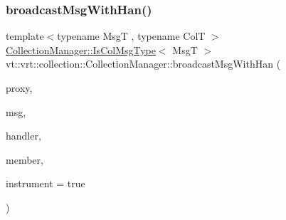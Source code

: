 \mbox{\label{structvt_1_1vrt_1_1collection_1_1_collection_manager_a737913f12b46ddaacf64a699c56c1787}} 
\subsubsection{\texorpdfstring{broadcast\+Msg\+With\+Han()}{broadcastMsgWithHan()}\hspace{0.1cm}{\footnotesize\ttfamily [2/2]}}
{\footnotesize\ttfamily template$<$typename MsgT , typename ColT $>$ \\
\hyperlink{structvt_1_1vrt_1_1collection_1_1_collection_manager_a21c21612c806016788057aeab142af20}{Collection\+Manager\+::\+Is\+Col\+Msg\+Type}$<$ MsgT $>$ vt\+::vrt\+::collection\+::\+Collection\+Manager\+::broadcast\+Msg\+With\+Han (\begin{DoxyParamCaption}\item[{\hyperlink{structvt_1_1vrt_1_1collection_1_1_collection_manager_a56458ed7f9bb22b631b9b3a745f42f94}{Collection\+Proxy\+Wrap\+Type}$<$ ColT $>$ const \&}]{proxy,  }\item[{MsgT $\ast$}]{msg,  }\item[{\hyperlink{namespacevt_af64846b57dfcaf104da3ef6967917573}{Handler\+Type} const \&}]{handler,  }\item[{bool const}]{member,  }\item[{bool}]{instrument = {\ttfamily true} }\end{DoxyParamCaption})}

\mbox{\label{structvt_1_1vrt_1_1collection_1_1_collection_manager_ac5ebb9504dc55031027d8b0fbb96fe7e}} 

